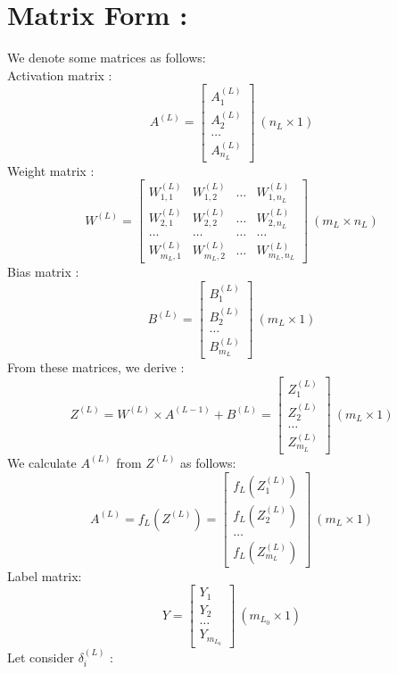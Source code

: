 \documentclass{article}
\begin{document}
    \section*{Matrix Form :}
    We denote some matrices as follows:
    \\
    Activation matrix :
    \[
        A^{(L)} = 
        \begin{bmatrix}
            A^{(L)}_1  \\ A^{(L)}_2 \\ \hdots \\ A^{(L)}_{n_L} 
        \end{bmatrix} \ (n_L \times 1)
    \]
    Weight matrix : 
    \[
        W^{(L)} = 
        \begin{bmatrix}
            W^{(L)}_{1, 1} & W^{(L)}_{1, 2} & \hdots & W^{(L)}_{1, n_L} \\
            W^{(L)}_{2, 1} & W^{(L)}_{2, 2} & \hdots & W^{(L)}_{2, n_L} \\
            \hdots & \hdots & \hdots & \hdots \\
            W^{(L)}_{m_L, 1} & W^{(L)}_{m_L, 2} & \hdots & W^{(L)}_{m_L, n_L} 
        \end{bmatrix} \ (m_L \times n_L)
    \]
    Bias matrix : 
    \[
        B^{(L)} = 
        \begin{bmatrix}
            B^{(L)}_1  \\ B^{(L)}_2 \\ \hdots \\ B^{(L)}_{m_L} 
        \end{bmatrix} \ (m_L \times 1)
    \]
    From these matrices, we derive :
    \[
        Z^{(L)} = W^{(L)} \times A^{(L - 1)} + B^{(L)} = 
        \begin{bmatrix}
            Z^{(L)}_1  \\ Z^{(L)}_2 \\ \hdots \\ Z^{(L)}_{m_L}
        \end{bmatrix} \ (m_L \times 1)
    \]
    We calculate $A^{(L)}$ from $Z^{(L)}$ as follows:
    \[
        A^{(L)} = f_L\left(Z^{(L)}\right) = 
        \begin{bmatrix}
            f_L\left(Z^{(L)}_1\right)  \\ 
            f_L\left(Z^{(L)}_2\right) \\ 
            \hdots \\ 
            f_L\left(Z^{(L)}_{m_L}\right)
        \end{bmatrix} \ (m_L \times 1)
    \]
    Label matrix:
    \[
        Y = 
        \begin{bmatrix}
            Y_1  \\ Y_2 \\ \hdots \\ Y_{m_{L_0}} 
        \end{bmatrix} \ (m_{L_0} \times 1)
    \]
    Let consider $\delta^{(L)}_i$ :
    \\
\end{document}
